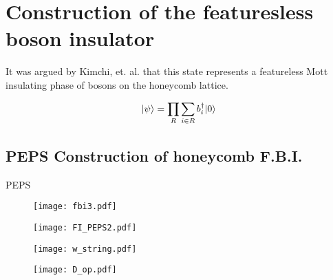 
\section{Construction of the featuresless boson insulator}

It was argued by Kimchi, et. al. \cite{kimchi2013} that this state represents a featureless Mott insulating phase of bosons on the honeycomb lattice.

\begin{equation}
\vert \psi \rangle = \prod\limits_{R} \sum\limits_{i \in R} b^{\dagger}_{i} \vert 0 \rangle
\label{eq:def}
\end{equation}


\subsection{PEPS Construction of honeycomb F.B.I.}

PEPS\cite{verstraete2004}

\begin{figure}[H]
	\centering
	\texttt{[image: fbi3.pdf]}
\end{figure}

\begin{figure}[H]
	\centering
	\texttt{[image: FI\_PEPS2.pdf]}
\end{figure}

\begin{figure}[H]
	\centering
	\texttt{[image: w\_string.pdf]}
\end{figure}

\begin{figure}[H]
	\centering
	\texttt{[image: D\_op.pdf]}
\end{figure}
